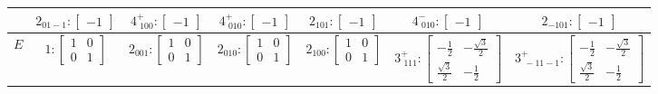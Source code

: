 \documentclass[fleqn,8pt,landscape]{jsarticle}
\begin{document}
\begin{longtable}{ccccccc}
& $ 2{}_{01-1}:\begin{bmatrix} -1 \end{bmatrix} $ & $ 4^{+}_{\,\,100}:\begin{bmatrix} -1 \end{bmatrix} $ & $ 4^{+}_{\,\,010}:\begin{bmatrix} -1 \end{bmatrix} $ & $ 2{}_{101}:\begin{bmatrix} -1 \end{bmatrix} $ & $ 4^{-}_{\,\,010}:\begin{bmatrix} -1 \end{bmatrix} $ & $ 2{}_{-101}:\begin{bmatrix} -1 \end{bmatrix} $ \\ \hline
$ E $ & $ 1:\begin{bmatrix} 1 & 0 \\ 0 & 1 \end{bmatrix} $ & $ 2{}_{001}:\begin{bmatrix} 1 & 0 \\ 0 & 1 \end{bmatrix} $ & $ 2{}_{010}:\begin{bmatrix} 1 & 0 \\ 0 & 1 \end{bmatrix} $ & $ 2{}_{100}:\begin{bmatrix} 1 & 0 \\ 0 & 1 \end{bmatrix} $ & $ 3^{+}_{\,\,111}:\begin{bmatrix} - \frac{1}{2} & - \frac{\sqrt{3}}{2} \\ \frac{\sqrt{3}}{2} & - \frac{1}{2} \end{bmatrix} $ & $ 3^{+}_{\,\,-11-1}:\begin{bmatrix} - \frac{1}{2} & - \frac{\sqrt{3}}{2} \\ \frac{\sqrt{3}}{2} & - \frac{1}{2} \end{bmatrix} $ \\

\end{longtable}
\end{document}
